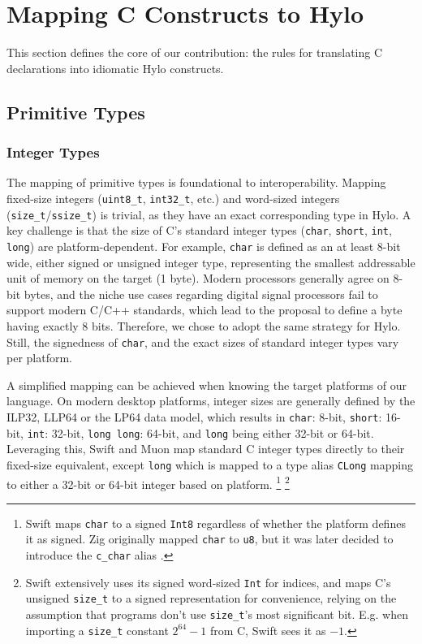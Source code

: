 \section{Mapping C Constructs to Hylo}
\label{sec:mapping_c_constructs}

This section defines the core of our contribution: the rules for translating C declarations into idiomatic Hylo constructs.

\subsection{Primitive Types}
\subsubsection{Integer Types}
\label{ssec:integer_types_mapping}
The mapping of primitive types is foundational to interoperability. Mapping fixed-size integers (\texttt{uint8\_t}, \texttt{int32\_t}, etc.) and word-sized integers (\texttt{size\_t}/\texttt{ssize\_t}) is trivial, as they have an exact corresponding type in Hylo. A key challenge is that the size of C's standard integer types (\texttt{char}, \texttt{short}, \texttt{int}, \texttt{long}) are platform-dependent. For example, \texttt{char} is defined as an at least 8-bit wide, either signed or unsigned integer type, representing the smallest addressable unit of memory on the target (1 byte). Modern processors generally agree on 8-bit bytes, and the niche use cases regarding digital signal processors fail to support modern C/C++ standards, which lead to the proposal \cite{P3477R1} to define a byte having exactly 8 bits. Therefore, we chose to adopt the same strategy for Hylo. Still, the signedness of \texttt{char}, and the exact sizes of standard integer types vary per platform.



A simplified mapping can be achieved when knowing the target platforms of our language. On modern desktop platforms, integer sizes are generally defined by the ILP32, LLP64 or the LP64 data model, which results in \texttt{char}: 8-bit, \texttt{short}: 16-bit, \texttt{int}: 32-bit, \texttt{long long}: 64-bit, and \texttt{long} being either 32-bit or 64-bit. Leveraging this, Swift and Muon map standard C integer types directly to their fixed-size equivalent, except \texttt{long} which is mapped to a type alias \texttt{CLong} mapping to either a 32-bit or 64-bit integer based on platform.
\footnote{
    Swift maps \texttt{char} to a signed \texttt{Int8} regardless of whether the platform defines it as signed. Zig originally mapped \texttt{char} to \texttt{u8}, but it was later decided to introduce the \texttt{c\_char} alias \cite{zig-add-cchar}.
}
\footnote{
    Swift extensively uses its signed word-sized \texttt{Int} for indices, and maps C's unsigned \texttt{size\_t} to a signed representation for convenience, relying on the assumption that programs don't use \texttt{size\_t}'s most significant bit. E.g. when importing a \texttt{size\_t} constant $2^{64} -1$ from C, Swift sees it as $-1$.
}



